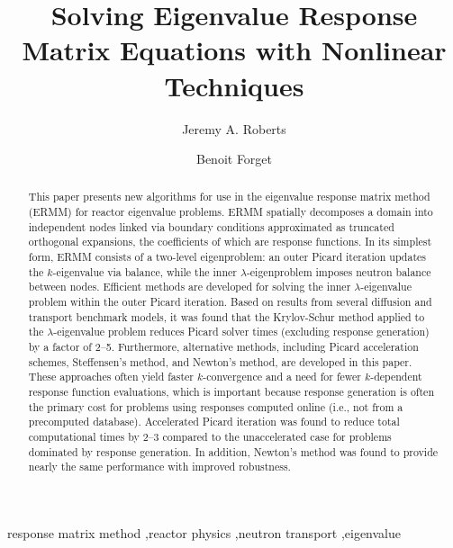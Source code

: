 \documentclass[preprint, 11pt]{elsarticle}
\begin{document}
\begin{frontmatter}

\title{Solving Eigenvalue Response Matrix Equations with 
       Nonlinear Techniques}


\author[label1]{Jeremy A. Roberts}
\author[label2]{Benoit Forget}
\address[label1]{Department of Mechanical and Nuclear Engineering,
                 Kansas State University, 3002 Rathbone Hall, Manhattan, KS 66506, USA}
\address[label2]{Department of Nuclear Science and Engineering, 
                 Massachusetts Institute of Technology,
                 77 Massachusetts Avenue, 24-107, Cambridge, MA 02139, USA}

\begin{abstract}

This paper presents new algorithms for use in the eigenvalue response matrix 
method (ERMM) for reactor eigenvalue problems.  ERMM spatially decomposes a
domain into independent nodes linked via boundary conditions approximated as 
truncated orthogonal expansions, the coefficients of which are response 
functions. In its simplest form, ERMM consists of a two-level eigenproblem: 
an outer Picard iteration updates the $k$-eigenvalue via balance,
while the inner $\lambda$-eigenproblem imposes neutron balance between nodes.  
Efficient methods are developed for solving the inner $\lambda$-eigenvalue 
problem within the outer Picard iteration. Based on results from  
several diffusion and transport benchmark models, it was found that 
the Krylov-Schur method applied to the $\lambda$-eigenvalue problem reduces 
Picard solver times (excluding response generation) by a factor of 2--5. 
Furthermore, alternative methods, including Picard acceleration schemes, 
Steffensen's method, and Newton's method, are developed in this paper.  
These approaches often yield faster $k$-convergence and a need for fewer 
$k$-dependent response function evaluations, which is important because 
response generation is often the primary cost for problems using responses 
computed online (i.e., not from a precomputed database). 
Accelerated Picard iteration was found to reduce total computational 
times by 2--3 compared to the unaccelerated case for problems dominated by 
response generation.  In addition, Newton's method was found to provide 
nearly the same performance with improved robustness.
\end{abstract}

\begin{keyword}

response matrix method \sep reactor physics \sep neutron transport \sep eigenvalue
\end{keyword}

\end{frontmatter}






%
\end{document}
